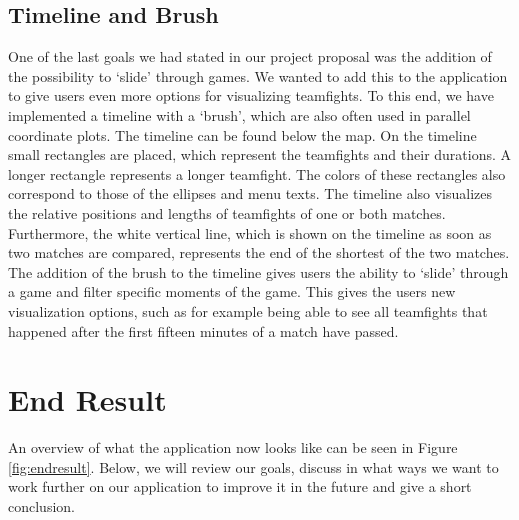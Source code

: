\documentclass[11pt,twoside,a4paper]{article}
\begin{document}
\subsection{Timeline and Brush}
\label{subsec:timeline}
One of the last goals we had stated in our project proposal was the addition of the possibility to `slide' through games. We wanted to add this to the application to give users even more options for visualizing teamfights. To this end, we have implemented a timeline with a `brush', which are also often used in parallel coordinate plots.\newline
The timeline can be found below the map. On the timeline small rectangles are placed, which represent the teamfights and their durations. A longer rectangle represents a longer teamfight. The colors of these rectangles also correspond to those of the ellipses and menu texts. The timeline also visualizes the relative positions and lengths of teamfights of one or both matches. Furthermore, the white vertical line, which is shown on the timeline as soon as two matches are compared, represents the end of the shortest of the two matches.\newline\newline
The addition of the brush to the timeline gives users the ability to `slide' through a game and filter specific moments of the game. This gives the users new visualization options, such as for example being able to see all teamfights that happened after the first fifteen minutes of a match have passed. 

\section{End Result}
\label{sec:endresult}
An overview of what the application now looks like can be seen in Figure \ref{fig:endresult}. Below, we will review our goals, discuss in what ways we want to work further on our application to improve it in the future and give a short conclusion.
\end{document}
